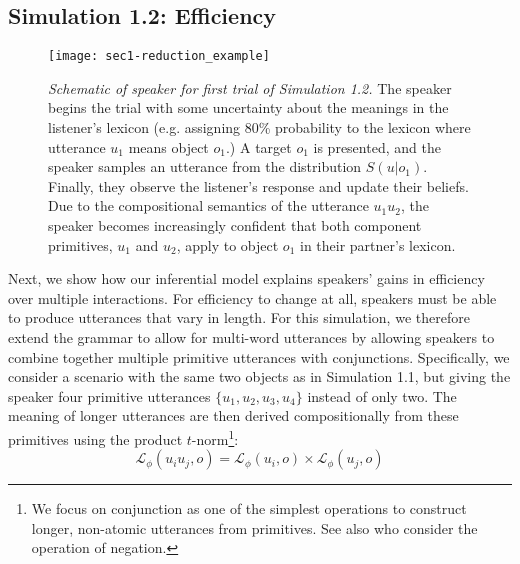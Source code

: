 \subsection{Simulation 1.2: Efficiency}

\begin{figure*}
\centering
    \texttt{[image: sec1-reduction\_example]}
  \caption{\emph{Schematic of speaker for first trial of Simulation 1.2.}  The speaker begins the trial with some uncertainty about the meanings in the listener's lexicon (e.g. assigning 80\% probability to the lexicon where utterance $u_1$ means object $o_1$.) A target $o_1$ is presented, and the speaker samples an utterance from the distribution $S(u|o_1)$. Finally, they observe the listener's response and update their beliefs. Due to the compositional semantics of the utterance $u_1u_2$, the speaker becomes increasingly confident that both component primitives, $u_1$ and $u_2$, apply to object $o_1$ in their partner's lexicon.}
  \label{fig:sec1efficiency}
\end{figure*}

Next, we show how our inferential model explains speakers' gains in efficiency over multiple interactions. 
For efficiency to change at all, speakers must be able to produce utterances that vary in length. 
For this simulation, we therefore extend the grammar to allow for multi-word utterances by allowing speakers to combine together multiple primitive utterances with conjunctions.
Specifically, we consider a scenario with the same two objects as in Simulation 1.1, but giving the speaker four primitive utterances $\{u_1, u_2, u_3, u_4\}$ instead of only two. 
The meaning of longer utterances are then derived compositionally from these primitives using the product $t$-norm\footnote{We focus on conjunction as one of the simplest operations to construct longer, non-atomic utterances from primitives. See also  who consider the operation of negation.}:
$$\mathcal{L}_\phi(u_iu_j, o) = \mathcal{L}_\phi(u_i, o) \times \mathcal{L}_\phi(u_j, o)$$


